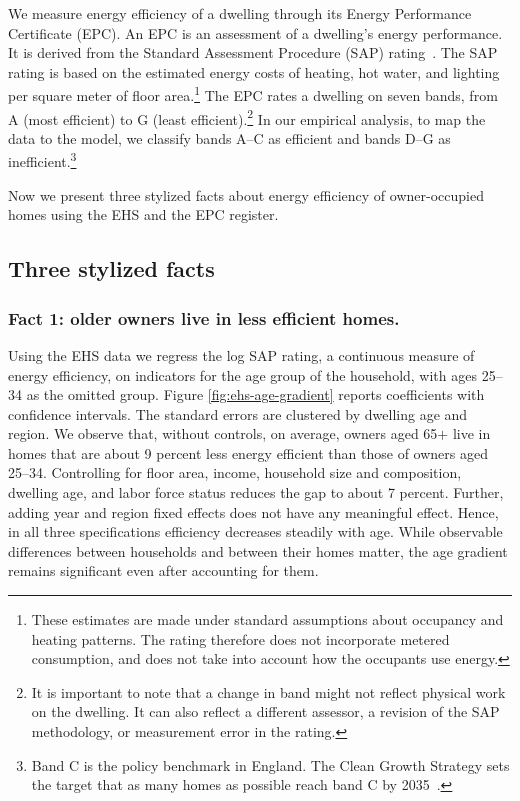 We measure energy efficiency of a dwelling through its  Energy Performance Certificate (EPC). An EPC is an assessment of a dwelling's energy performance. It is derived from the Standard Assessment Procedure (SAP) rating~\citep{bre_sap2012}. The SAP rating is based on the estimated energy costs of heating, hot water, and lighting per square meter of floor area.\footnote{These estimates are made under standard assumptions about occupancy and heating patterns. The rating therefore does not incorporate metered consumption, and does not take into account how the occupants use energy.} The EPC rates a dwelling on seven bands, from A (most efficient) to G (least efficient).\footnote{It is important to note that a change in band might not reflect physical work on the dwelling. It can also reflect a different assessor, a revision of the SAP methodology, or measurement error in the rating. } In our empirical analysis, to map the data to the model, we classify bands A--C as efficient and bands D--G as inefficient.\footnote{Band C is the policy benchmark in England. The Clean Growth Strategy sets the target that as many homes as possible reach band C by 2035~\citep{hmg2017cleangrowth}.}



Now we present three stylized facts about energy efficiency of owner-occupied homes using the EHS and the EPC register.
\subsection{Three stylized facts}\label{sec:data-facts}


\subsubsection{Fact 1: older owners live in less efficient homes.}\label{sec:data-age-gradient}




Using the EHS data we regress the log SAP rating, a continuous measure of energy efficiency, on indicators for the age group of the household, with ages 25--34 as the omitted group.
Figure \ref{fig:ehs-age-gradient} reports coefficients with confidence intervals. The standard errors are clustered by dwelling age and region.  We observe that, without controls, on average, owners aged 65$+$ live in homes that are about 9 percent less energy efficient than those of owners aged 25--34. Controlling for floor area, income, household size and composition, dwelling age, and labor force status reduces
the gap to about 7 percent. Further, adding year and region fixed effects does not have any meaningful effect. Hence,  in all three specifications efficiency decreases steadily with age. While observable differences between households and between their homes matter, the age gradient remains significant even after accounting for them.


